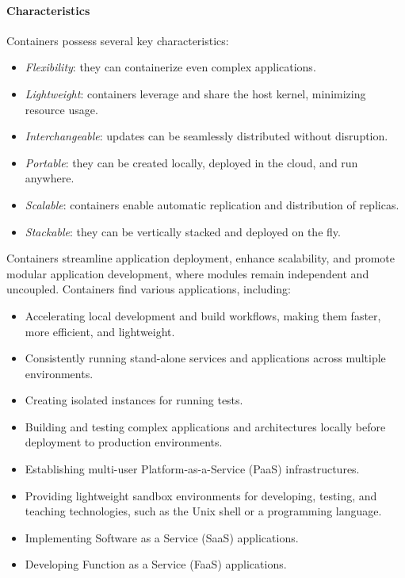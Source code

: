 \paragraph*{Characteristics}
Containers possess several key characteristics:
\begin{itemize}
    \item \textit{Flexibility}: they can containerize even complex applications.
    \item \textit{Lightweight}: containers leverage and share the host kernel, minimizing resource usage.
    \item \textit{Interchangeable}: updates can be seamlessly distributed without disruption.
    \item \textit{Portable}: they can be created locally, deployed in the cloud, and run anywhere.
    \item \textit{Scalable}: containers enable automatic replication and distribution of replicas.
    \item \textit{Stackable}: they can be vertically stacked and deployed on the fly.
\end{itemize}
Containers streamline application deployment, enhance scalability, and promote modular application development, where modules remain independent and uncoupled.
Containers find various applications, including:
\begin{itemize}
    \item Accelerating local development and build workflows, making them faster, more efficient, and lightweight.
    \item Consistently running stand-alone services and applications across multiple environments.
    \item Creating isolated instances for running tests.
    \item Building and testing complex applications and architectures locally before deployment to production environments.
    \item Establishing multi-user Platform-as-a-Service (PaaS) infrastructures.
    \item Providing lightweight sandbox environments for developing, testing, and teaching technologies, such as the Unix shell or a programming language.
    \item Implementing Software as a Service (SaaS) applications.
    \item Developing Function as a Service (FaaS) applications.
\end{itemize}

